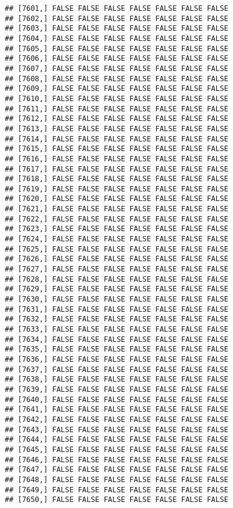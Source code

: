\documentclass[
]{article}
\begin{document}
\begin{verbatim}
## [7601,] FALSE FALSE FALSE FALSE FALSE FALSE FALSE
## [7602,] FALSE FALSE FALSE FALSE FALSE FALSE FALSE
## [7603,] FALSE FALSE FALSE FALSE FALSE FALSE FALSE
## [7604,] FALSE FALSE FALSE FALSE FALSE FALSE FALSE
## [7605,] FALSE FALSE FALSE FALSE FALSE FALSE FALSE
## [7606,] FALSE FALSE FALSE FALSE FALSE FALSE FALSE
## [7607,] FALSE FALSE FALSE FALSE FALSE FALSE FALSE
## [7608,] FALSE FALSE FALSE FALSE FALSE FALSE FALSE
## [7609,] FALSE FALSE FALSE FALSE FALSE FALSE FALSE
## [7610,] FALSE FALSE FALSE FALSE FALSE FALSE FALSE
## [7611,] FALSE FALSE FALSE FALSE FALSE FALSE FALSE
## [7612,] FALSE FALSE FALSE FALSE FALSE FALSE FALSE
## [7613,] FALSE FALSE FALSE FALSE FALSE FALSE FALSE
## [7614,] FALSE FALSE FALSE FALSE FALSE FALSE FALSE
## [7615,] FALSE FALSE FALSE FALSE FALSE FALSE FALSE
## [7616,] FALSE FALSE FALSE FALSE FALSE FALSE FALSE
## [7617,] FALSE FALSE FALSE FALSE FALSE FALSE FALSE
## [7618,] FALSE FALSE FALSE FALSE FALSE FALSE FALSE
## [7619,] FALSE FALSE FALSE FALSE FALSE FALSE FALSE
## [7620,] FALSE FALSE FALSE FALSE FALSE FALSE FALSE
## [7621,] FALSE FALSE FALSE FALSE FALSE FALSE FALSE
## [7622,] FALSE FALSE FALSE FALSE FALSE FALSE FALSE
## [7623,] FALSE FALSE FALSE FALSE FALSE FALSE FALSE
## [7624,] FALSE FALSE FALSE FALSE FALSE FALSE FALSE
## [7625,] FALSE FALSE FALSE FALSE FALSE FALSE FALSE
## [7626,] FALSE FALSE FALSE FALSE FALSE FALSE FALSE
## [7627,] FALSE FALSE FALSE FALSE FALSE FALSE FALSE
## [7628,] FALSE FALSE FALSE FALSE FALSE FALSE FALSE
## [7629,] FALSE FALSE FALSE FALSE FALSE FALSE FALSE
## [7630,] FALSE FALSE FALSE FALSE FALSE FALSE FALSE
## [7631,] FALSE FALSE FALSE FALSE FALSE FALSE FALSE
## [7632,] FALSE FALSE FALSE FALSE FALSE FALSE FALSE
## [7633,] FALSE FALSE FALSE FALSE FALSE FALSE FALSE
## [7634,] FALSE FALSE FALSE FALSE FALSE FALSE FALSE
## [7635,] FALSE FALSE FALSE FALSE FALSE FALSE FALSE
## [7636,] FALSE FALSE FALSE FALSE FALSE FALSE FALSE
## [7637,] FALSE FALSE FALSE FALSE FALSE FALSE FALSE
## [7638,] FALSE FALSE FALSE FALSE FALSE FALSE FALSE
## [7639,] FALSE FALSE FALSE FALSE FALSE FALSE FALSE
## [7640,] FALSE FALSE FALSE FALSE FALSE FALSE FALSE
## [7641,] FALSE FALSE FALSE FALSE FALSE FALSE FALSE
## [7642,] FALSE FALSE FALSE FALSE FALSE FALSE FALSE
## [7643,] FALSE FALSE FALSE FALSE FALSE FALSE FALSE
## [7644,] FALSE FALSE FALSE FALSE FALSE FALSE FALSE
## [7645,] FALSE FALSE FALSE FALSE FALSE FALSE FALSE
## [7646,] FALSE FALSE FALSE FALSE FALSE FALSE FALSE
## [7647,] FALSE FALSE FALSE FALSE FALSE FALSE FALSE
## [7648,] FALSE FALSE FALSE FALSE FALSE FALSE FALSE
## [7649,] FALSE FALSE FALSE FALSE FALSE FALSE FALSE
## [7650,] FALSE FALSE FALSE FALSE FALSE FALSE FALSE

\end{verbatim}
\end{document}

